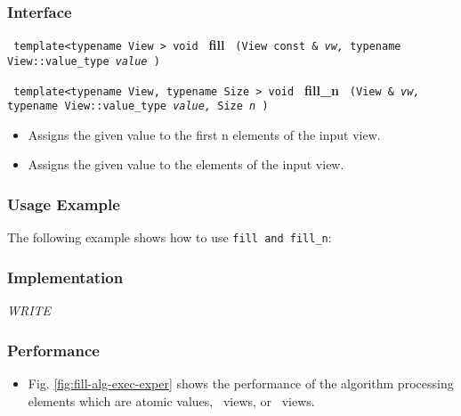 \subsubsection{Interface} %

\noindent
\texttt{%
template<typename View >
\newline
void 
}
\newline
\textbf{fill}%
\texttt{%
(View const \&
\textit{vw,}%
typename View::value\_type 
\textit{value}%
)
}
\vspace{0.4cm}

\noindent
\texttt{%
template<typename View, typename Size >
\newline
void 
}
\newline
\textbf{fill\_n}%
\texttt{%
(View \&
\textit{vw,}%
typename View::value\_type 
\textit{value,}%
Size 
\textit{n}%
)
}
\vspace{0.4cm}

\begin{itemize}
\item
Assigns the given value to the first n elements of the input view. 
\item
Assigns the given value to the elements of the input view. 
\end{itemize}
 
\subsubsection{Usage Example} %

The following example shows how to use \texttt{fill and fill\_n}:

 
\subsubsection{Implementation} %

\textit{WRITE}

\subsubsection{Performance} %

\begin{itemize}
\item
Fig. \ref{fig:fill-alg-exec-exper}
shows the performance of the algorithm processing
elements which are atomic values, \stl\ views, or \stapl\ views.
\end{itemize}

